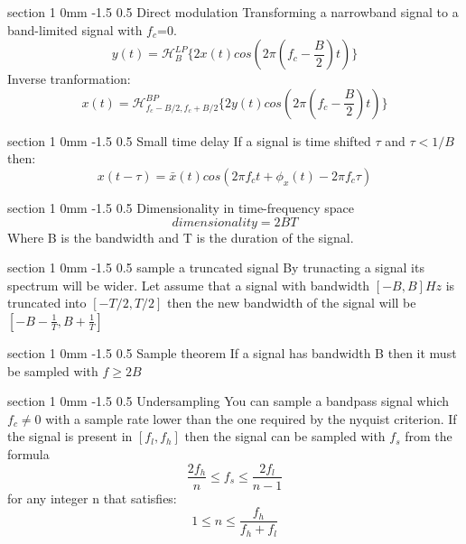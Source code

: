 \documentclass[a4paper,11pt]{article}
\makeatletter
\renewcommand{\section}{\@startsection
   {section}%
   {1}%
   {0mm}%
   {-1.5\baselineskip}%
   {0.5\baselineskip}%
   {\sffamily\bfseries\upshape\normalsize}}%
\makeatother
\begin{document}
\section{Direct modulation}
Transforming a narrowband signal to a band-limited signal with $f_c$=0.
$$y(t)=\mathcal{H}_{B}^{LP}\{ 2x(t)cos(2\pi(f_c -\frac{B}{2})t) \}$$
Inverse tranformation:
$$x(t)=\mathcal{H}_{f_c-B/2,f_c+B/2}^{BP}\{ 2y(t)cos(2\pi(f_c -\frac{B}{2})t) \}$$

\section{Small time delay}
If a signal is time shifted $\tau$ and $\tau<1/B$ then:
$$x(t-\tau)=\bar{x}(t)cos(2\pi f_c t+\phi_x(t)-2\pi f_c \tau)$$
 
 \section{Dimensionality in time-frequency space}
 $$dimensionality=2BT$$
 Where B is the bandwidth and T is the duration of the signal.
 
 \section{sample a truncated signal}
 By trunacting a signal its spectrum will be wider. Let assume that a signal with bandwidth $[-B,B] Hz$ is truncated into $[-T/2,T/2]$ then the new bandwidth of the signal will be $[-B-\frac{1}{T},B+\frac{1}{T}]$
 
 \section{Sample theorem}
 If a signal has bandwidth B then it must be sampled with $f\geq 2B$
 
 \section{Undersampling}
 You can sample a bandpass signal which $f_c\ne0$ with a sample rate lower than the one required by the nyquist criterion. If the signal is present in $[f_l,f_h]$ then
 the signal can be sampled with $f_s$ from the formula
 $$\frac{2f_h}{n}\leq f_s \leq \frac{2f_l}{n-1}$$
 for any integer n that satisfies:
 $$1\leq n \leq \frac{f_h}{f_h+f_l}$$
 
\end{document}
